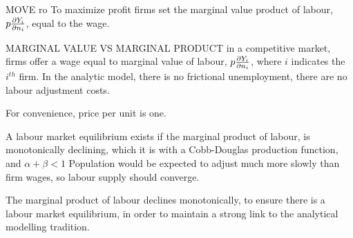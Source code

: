 MOVE ro
To maximize profit  firms set the marginal value product of labour, $p\frac{\partial Y_i}{\partial n_i}$, 
equal to the wage. 

MARGINAL VALUE VS MARGINAL PRODUCT
in a competitive market, firms offer a wage equal to marginal value of labour, 
 $p\frac{\partial Y_i}{\partial n_i}$, where $i$ indicates the $i^{th}$ firm. In the analytic model, there is no \gls{frictional unemployment}, there are no \glspl{labour adjustment cost}. 

 For convenience, price per unit is one. 

A labour market equilibrium exists if the marginal product of labour, is monotonically declining, which it is with a \gls{Cobb-Douglas} production function, and $\alpha + \beta<1$ 
Population would be expected to adjust much more slowly than firm wages, so labour supply should converge.

The marginal product of labour declines monotonically, to ensure there is a labour market equilibrium, in order to maintain a strong link to the analytical modelling tradition.



